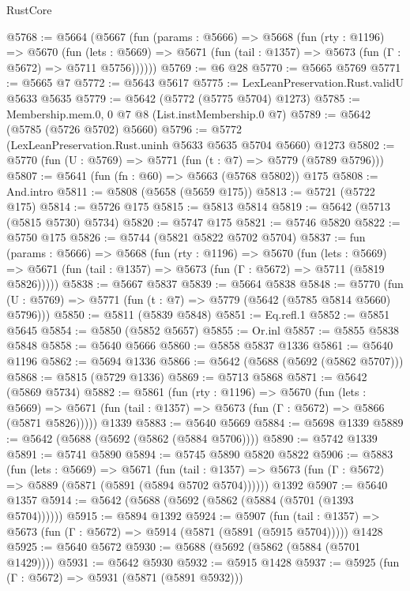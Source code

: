 \begin{lexlean}{RustCore}
\begin{coremodule}
@5768 := @5664
    (@5667
      (fun (params : @5666) =>
      @5668
        (fun (rty : @1196) =>
        @5670
          (fun (lets : @5669) =>
          @5671 (fun (tail : @1357) => @5673 (fun (Γ : @5672) => @5711 @5756))))))
@5769 := @6 @28
@5770 := @5665 @5769
@5771 := @5665 @7
@5772 := @5643 @5617
@5775 := LexLeanPreservation.Rust.validU @5633 @5635
@5779 := @5642 (@5772 (@5775 @5704) @1273)
@5785 := Membership.mem.{0, 0} @7 @8 (List.instMembership.{0} @7)
@5789 := @5642 (@5785 (@5726 @5702) @5660)
@5796 := @5772 (LexLeanPreservation.Rust.uninh @5633 @5635 @5704 @5660) @1273
@5802 := @5770 (fun (U : @5769) => @5771 (fun (t : @7) => @5779 (@5789 @5796)))
@5807 := @5641 (fun (fn : @60) => @5663 (@5768 @5802)) @175
@5808 := And.intro
@5811 := @5808 (@5658 (@5659 @175))
@5813 := @5721 (@5722 @175)
@5814 := @5726 @175
@5815 := @5813 @5814
@5819 := @5642 (@5713 (@5815 @5730) @5734)
@5820 := @5747 @175
@5821 := @5746 @5820
@5822 := @5750 @175
@5826 := @5744 (@5821 @5822 @5702 @5704)
@5837 := fun (params : @5666) =>
  @5668
    (fun (rty : @1196) =>
    @5670
      (fun (lets : @5669) =>
      @5671 (fun (tail : @1357) => @5673 (fun (Γ : @5672) => @5711 (@5819 @5826)))))
@5838 := @5667 @5837
@5839 := @5664 @5838
@5848 := @5770 (fun (U : @5769) => @5771 (fun (t : @7) => @5779 (@5642 (@5785 @5814 @5660) @5796)))
@5850 := @5811 (@5839 @5848)
@5851 := Eq.refl.{1}
@5852 := @5851 @5645
@5854 := @5850 (@5852 @5657)
@5855 := Or.inl
@5857 := @5855 @5838 @5848
@5858 := @5640 @5666
@5860 := @5858 @5837 @1336
@5861 := @5640 @1196
@5862 := @5694 @1336
@5866 := @5642 (@5688 (@5692 (@5862 @5707)))
@5868 := @5815 (@5729 @1336)
@5869 := @5713 @5868
@5871 := @5642 (@5869 @5734)
@5882 := @5861
    (fun (rty : @1196) =>
    @5670
      (fun (lets : @5669) =>
      @5671 (fun (tail : @1357) => @5673 (fun (Γ : @5672) => @5866 (@5871 @5826)))))
    @1339
@5883 := @5640 @5669
@5884 := @5698 @1339
@5889 := @5642 (@5688 (@5692 (@5862 (@5884 @5706))))
@5890 := @5742 @1339
@5891 := @5741 @5890
@5894 := @5745 @5890 @5820 @5822
@5906 := @5883
    (fun (lets : @5669) =>
    @5671
      (fun (tail : @1357) => @5673 (fun (Γ : @5672) => @5889 (@5871 (@5891 (@5894 @5702 @5704))))))
    @1392
@5907 := @5640 @1357
@5914 := @5642 (@5688 (@5692 (@5862 (@5884 (@5701 (@1393 @5704))))))
@5915 := @5894 @1392
@5924 := @5907
    (fun (tail : @1357) => @5673 (fun (Γ : @5672) => @5914 (@5871 (@5891 (@5915 @5704)))))
    @1428
@5925 := @5640 @5672
@5930 := @5688 (@5692 (@5862 (@5884 (@5701 @1429))))
@5931 := @5642 @5930
@5932 := @5915 @1428
@5937 := @5925 (fun (Γ : @5672) => @5931 (@5871 (@5891 @5932)))

\end{coremodule}
\end{lexlean}
